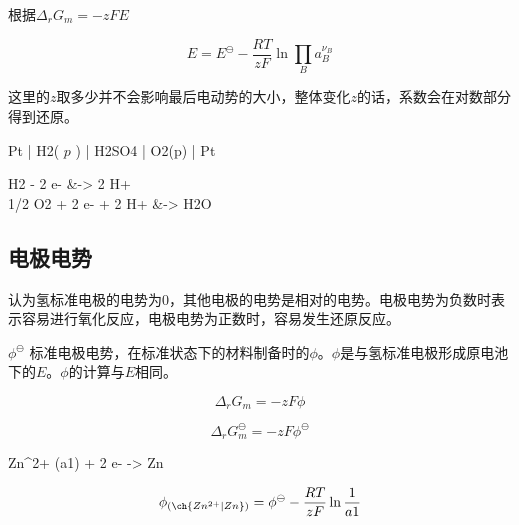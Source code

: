     根据$\Delta_r G_m = -zFE$

    \begin{equation*}
        E = E^\ominus - \frac{RT}{zF} \ln \prod _{B} a_B^{\nu_B}
    \end{equation*}

    这里的$z$取多少并不会影响最后电动势的大小，整体变化$z$的话，系数会在对数部分得到还原。

    \begin{reaction*}
        Pt | H2( $p$ ) | H2SO4 | O2(p) | Pt
    \end{reaction*}


    \begin{reactions*}
        H2 - 2 e- &-> 2 H+ \\
        1/2 O2 + 2 e- + 2 H+ &-> H2O
    \end{reactions*}

    \subsection{电极电势}

    认为氢标准电极的电势为0，其他电极的电势是相对的电势。电极电势为负数时表示容易进行氧化反应，电极电势为正数时，容易发生还原反应。

    $\phi^{\ominus}$ 标准电极电势，在标准状态下的材料制备时的$\phi$。$\phi$是与氢标准电极形成原电池下的$E$。$\phi$的计算与$E$相同。

    \begin{equation*}
        \Delta_r G_m = -zF\phi
    \end{equation*}

    \begin{equation*}
        \Delta_r G_m ^\ominus = -zF\phi ^\ominus
    \end{equation*}

    \begin{reaction*}
        Zn^{2+} (a1) + 2 e- -> Zn
    \end{reaction*}

    \begin{equation*}
        \phi_{ \left( \ch{Zn^{2+} | Zn} \right) } = \phi^\ominus - \frac{RT}{zF} \ln \frac{1}{a1}
    \end{equation*}